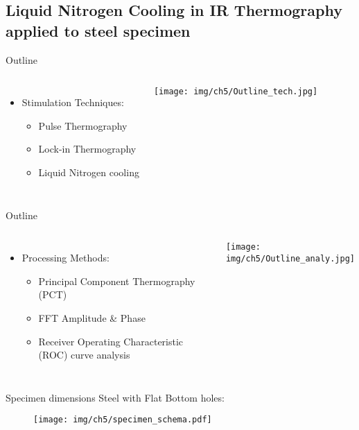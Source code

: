 \subsection{Liquid Nitrogen Cooling in IR Thermography applied to steel specimen}

\begin{frame}{Outline}
    \begin{columns}
           \begin{itemize}
                \item Stimulation Techniques:
                \begin{itemize}
                    \item Pulse Thermography
                    \item Lock-in Thermography
                    \item Liquid Nitrogen cooling
                \end{itemize}
            \end{itemize}
      \pause
      \centering
      \texttt{[image: img/ch5/Outline\_tech.jpg]}
    \end{columns}
\end{frame}

\begin{frame}{Outline}
    \begin{columns}
            \begin{itemize}
                \item Processing Methods:
                \begin{itemize}
                    \item Principal Component Thermography (PCT)
                    \item FFT Amplitude \& Phase
                    \item Receiver Operating Characteristic (ROC) curve analysis
                \end{itemize}  
            \end{itemize}
        \pause
      \centering
      \texttt{[image: img/ch5/Outline\_analy.jpg]}
    \end{columns}
\end{frame}


\begin{frame}{Specimen dimensions}
    Steel with Flat Bottom holes:
    \begin{figure}
        \centering
        \texttt{[image: img/ch5/specimen\_schema.pdf]}
    \end{figure}


\end{frame} 


